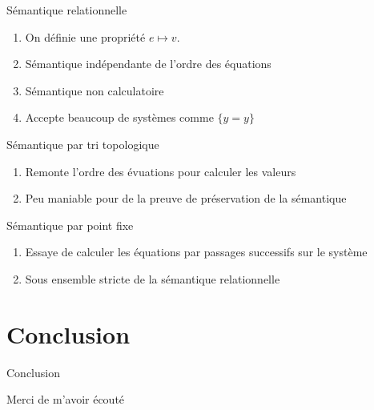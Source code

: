 \documentclass{beamer}
\begin{document}
\begin{frame}{Sémantique relationnelle}
\begin{enumerate}
\item<1-> On définie une propriété $e \mapsto v$.
\item<2-> Sémantique indépendante de l'ordre des équations
\item<3-> Sémantique non calculatoire
\item<4-> Accepte beaucoup de systèmes comme $\{y = y\}$
\end{enumerate}
\end{frame}

\begin{frame}{Sémantique par tri topologique}
\begin{enumerate}
\item<1-> Remonte l'ordre des évuations pour calculer les valeurs
\item<2-> Peu maniable pour de la preuve de préservation de la sémantique
\end{enumerate}
\end{frame}

\begin{frame}{Sémantique par point fixe}
\begin{enumerate}
\item<1-> Essaye de calculer les équations par passages successifs sur le système
\item<2-> Sous ensemble stricte de la sémantique relationnelle
\end{enumerate}
\end{frame}

\section{Conclusion}

\begin{frame}{Conclusion}

\end{frame}

\begin{frame}
Merci de m'avoir écouté
\end{frame}
\end{document}
